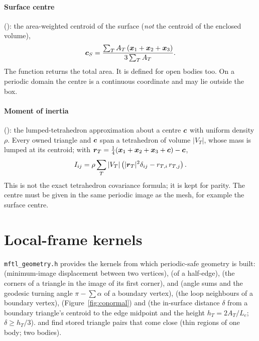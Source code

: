 \paragraph{Surface centre} (): the area-weighted centroid of the surface
(\emph{not} the centroid of the enclosed volume),
\begin{equation}
  \boldsymbol{c}_S = \frac{\sum_T A_T\,(\boldsymbol{x}_1+\boldsymbol{x}_2+\boldsymbol{x}_3)}{3\sum_T A_T}.
\end{equation}
The function returns the total area. It is defined for open bodies too. On a periodic domain
the centre is a continuous coordinate and may lie outside the box.

\paragraph{Moment of inertia} (): the \mftlone{} lumped-tetrahedron
approximation about a centre $\boldsymbol{c}$ with uniform density $\rho$. Every owned triangle and
$\boldsymbol{c}$ span a tetrahedron of volume $|V_T|$, whose mass is lumped at its centroid; with
$\boldsymbol{r}_T=\tfrac14(\boldsymbol{x}_1+\boldsymbol{x}_2+\boldsymbol{x}_3+\boldsymbol{c})-\boldsymbol{c}$,
\begin{equation}
  I_{ij} = \rho\sum_{T}|V_T|\left(\lvert\boldsymbol{r}_T\rvert^2\delta_{ij}-r_{T,i}\,r_{T,j}\right).
\end{equation}
This is not the exact tetrahedron covariance formula; it is kept for \mftlone{} parity. The
centre must be given in the same periodic image as the mesh, for example the surface centre.

\section{Local-frame kernels}

\texttt{mftl\_geometry.h} provides the kernels from which periodic-safe geometry is built:
 (minimum-image displacement between two vertices),  (of a
half-edge),  (the corners of a triangle in the image of its first
corner),  and  (angle sums and the geodesic
turning angle $\pi-\sum\alpha$ of a boundary vertex),  (the loop
neighbours of a boundary vertex),  (Figure~\ref{fig:conormal}) and
 (the in-surface distance $\delta$ from a boundary
triangle's centroid to the edge midpoint and the height $h_T=2A_T/L_e$; $\delta\ge h_T/3$).
 and  find stored triangle pairs that come
close (thin regions of one body; two bodies).

